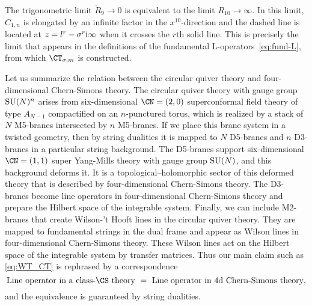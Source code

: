 The trigonometric limit $\check{R}_9 \to 0$ is equivalent to the limit
$R_{10} \to \infty$.  In this limit, $C_{1,n}$ is elongated by an
infinite factor in the $x^{10}$-direction and the dashed line is
located at $z = l^r - \sigma^r \mathrm{i}\infty$ when it crosses the $r$th
solid line.  This is precisely the limit that appears in the
definitions of the fundamental L-operators~\eqref{eq:fund-L}, from
which $\CT_{\sigma,m}$ is constructed.

Let us summarize the relation between the circular quiver theory and
four-dimensional Chern-Simons theory.  The circular quiver theory
with gauge group $\mathrm{SU}(N)^n$ arises from six-dimensional $\CN = (2,0)$
superconformal field theory of type $A_{N-1}$ compactified on an
$n$-punctured torus, which is realized by a stack of $N$ M5-branes
intersected by $n$ M5-branes.  If we place this brane system in a
twisted geometry, then by string dualities it is mapped to $N$
D5-branes and $n$ D3-branes in a particular string background.  The
D5-branes support six-dimensional $\CN = (1,1)$ super Yang-Mills
theory with gauge group $\mathrm{SU}(N)$, and this background deforms it.  It
is a topological--holomorphic sector of this deformed theory that is
described by four-dimensional Chern-Simons theory.  The D3-branes
become line operators in four-dimensional Chern-Simons theory and
prepare the Hilbert space of the integrable system.  Finally, we can
include M2-branes that create Wilson-'t Hooft lines in the circular
quiver theory.  They are mapped to fundamental strings in the dual
frame and appear as Wilson lines in four-dimensional Chern-Simons
theory.  These Wilson lines act on the Hilbert space of the integrable
system by transfer matrices.
Thus our main claim such as \eqref{eq:WT_CT} is rephrased by a correspondence
\begin{equation*}
  \text{Line operator in a class-$\CS$ theory }
  =
  \text{ Line operator in 4d Chern-Simons theory},
\end{equation*}
and the equivalence is guaranteed by string dualities.








